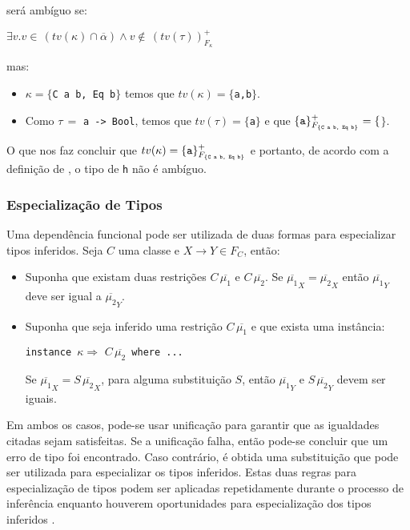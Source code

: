 ser\'a amb\'iguo se:
\begin{center}
$\exists v.v\in\,(tv(\kappa)\cap\overline{\alpha})\land v\not\in\, (tv(\tau))^{+}_{F_{\kappa}}$
\end{center}
mas:
\begin{itemize}
	\item $\kappa=\{$\texttt{C a b, Eq b}$\}$ temos que $tv(\kappa)=\{$\texttt{a,b}$\}$.
	\item Como $\tau\,=$ \texttt{a -> Bool}, temos que $tv(\tau)=\{$\texttt{a}$\}$ e que
	      $\{\text{\texttt{a}}\}^{+}_{F_{\{\text{\texttt{C a b, Eq b}}\}}}=\{$$\}$.
\end{itemize} 
O que nos faz concluir que $tv(\kappa)=\{\text{\texttt{a}}\}^{+}_{F_{\{\text{\texttt{C a b, Eq b}}\}}}$ e portanto, 
de acordo com a defini\c{c}\~ao de \cite{Jones00}, o tipo de \texttt{h} n\~ao \'e amb\'iguo.

\subsubsection{Especializa\c{c}\~ao de Tipos}

Uma depend\^encia funcional pode ser utilizada de duas formas para especializar tipos inferidos\cite{Jones00}. 
Seja $C$ uma classe e $X\rightarrow Y \in F_{C}$, ent\~ao:
\begin{itemize}
	\item Suponha que existam duas restri\c{c}\~oes $C\,\overline{\mu_{1}}$ e $C\,\overline{\mu_{2}}$. 
	      Se $\overline{\mu_{1}}_{X} = \overline{\mu_{2}}_{X}$ ent\~ao 
	      $\overline{\mu_{1}}_{Y}$ deve ser igual a $\overline{\mu_{2}}_{Y}$.
	\item Suponha que seja inferido uma restri\c{c}\~ao $C\,\overline{\mu_{1}}$ e que exista uma inst\^ancia:
	\begin{center}
		\texttt{instance $\kappa\Rightarrow\,\,C\,\overline{\mu_{2}}$ where ...}
	\end{center}
	Se $\overline{\mu_{1}}_{X} = S\,\overline{\mu_{2}}_{X}$, para alguma substitui\c{c}\~ao $S$, 
	ent\~ao $\overline{\mu_{1}}_{Y}$ e $S\,\overline{\mu_{2}}_{Y}$ devem ser iguais.
\end{itemize}

Em ambos os casos, pode-se usar unifica\c{c}\~ao para garantir que as igualdades citadas sejam satisfeitas. Se a
unifica\c{c}\~ao falha, ent\~ao pode-se concluir que um erro de tipo foi encontrado. Caso contr\'ario, \'e obtida
uma substitui\c{c}\~ao que pode ser utilizada para especializar os tipos inferidos. Estas duas regras para 
especializa\c{c}\~ao de tipos podem ser aplicadas repetidamente durante o processo de infer\^encia enquanto houverem
oportunidades para especializa\c{c}\~ao dos tipos inferidos \cite{Jones00, Jones09}.

